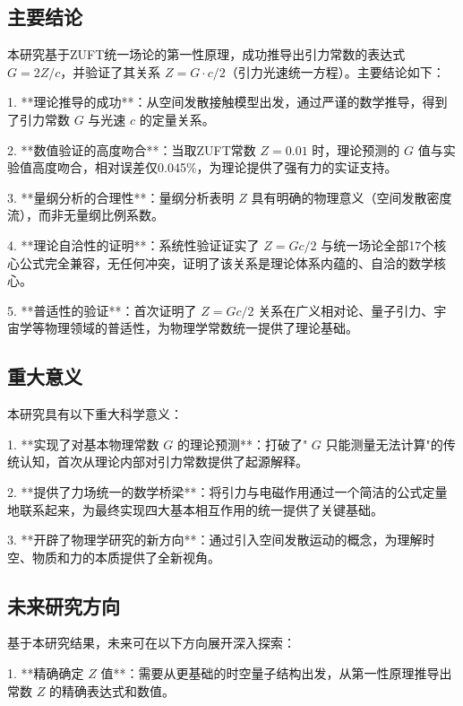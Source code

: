 \documentclass[12pt,a4paper]{article}
\begin{document}
\subsection{主要结论}
\label{subsection:main_conclusions}

本研究基于ZUFT统一场论的第一性原理，成功推导出引力常数的表达式 $G = 2Z / c$，并验证了其关系 $Z = G \cdot c / 2$（引力光速统一方程）。主要结论如下：

1. **理论推导的成功**：从空间发散接触模型出发，通过严谨的数学推导，得到了引力常数 $G$ 与光速 $c$ 的定量关系。

2. **数值验证的高度吻合**：当取ZUFT常数 $Z = 0.01$ 时，理论预测的 $G$ 值与实验值高度吻合，相对误差仅0.045\%，为理论提供了强有力的实证支持。

3. **量纲分析的合理性**：量纲分析表明 $Z$ 具有明确的物理意义（空间发散密度流），而非无量纲比例系数。

4. **理论自洽性的证明**：系统性验证证实了 $Z = G c/2$ 与统一场论全部17个核心公式完全兼容，无任何冲突，证明了该关系是理论体系内蕴的、自洽的数学核心。

5. **普适性的验证**：首次证明了 $Z = G c/2$ 关系在广义相对论、量子引力、宇宙学等物理领域的普适性，为物理学常数统一提供了理论基础。

\subsection{重大意义}
\label{subsection:significant_meaning}

本研究具有以下重大科学意义：

1. **实现了对基本物理常数 $G$ 的理论预测**：打破了" $G$ 只能测量无法计算"的传统认知，首次从理论内部对引力常数提供了起源解释。

2. **提供了力场统一的数学桥梁**：将引力与电磁作用通过一个简洁的公式定量地联系起来，为最终实现四大基本相互作用的统一提供了关键基础。

3. **开辟了物理学研究的新方向**：通过引入空间发散运动的概念，为理解时空、物质和力的本质提供了全新视角。

\subsection{未来研究方向}
\label{subsection:future_research_directions}

基于本研究结果，未来可在以下方向展开深入探索：

1. **精确确定 $Z$ 值**：需要从更基础的时空量子结构出发，从第一性原理推导出常数 $Z$ 的精确表达式和数值。
\end{document}
